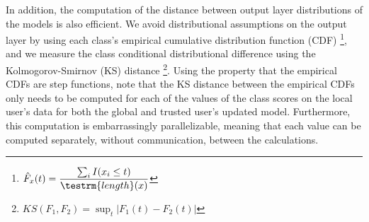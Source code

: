 \documentclass{article} %
\begin{document}
In addition, the computation of the distance between output layer distributions of the models is also efficient. We avoid distributional assumptions on the output layer by using each class's empirical cumulative distribution function (CDF) \footnote{$\hat F_x(t) = \dfrac{\sum_i I(x_i \leq t)}{\testrm{length}(x)}$}, and we measure the class conditional distributional difference using the Kolmogorov-Smirnov (KS) distance \footnote{$KS(F_1, F_2) = \sup_t | F_1(t) - F_2(t) |$}. Using the property that the empirical CDFs are step functions, note that the KS distance between the empirical CDFs only needs to be computed for each of the values of the class scores on the local user's data for both the global and trusted user's updated model. Furthermore, this computation is embarrassingly parallelizable, meaning that each value can be computed separately, without communication, between the calculations. 
\end{document}
